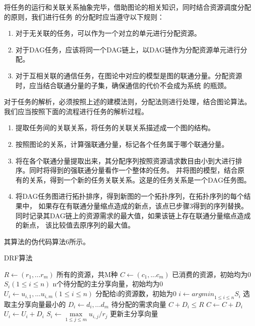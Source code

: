 将任务的运行和关联关系抽象完毕，借助图论的相关知识，同时结合资源调度分配的原则，我们进行任务
的分配时应当遵守以下规则：
\begin{enumerate}
\item 对于无关联的任务，可以作为一个对立的单元进行分配资源。
\item 对于DAG任务，应该将同一个DAG链上，以DAG链作为分配资源单元进行分配。
\item 对于互相关联的通信任务，在图论中对应的模型是图的联通分量。分配资源时，应当结合联通分量的子集，确保通信的代价不会成为系统
的瓶颈。
\end{enumerate}

对于任务的解析，必须按照上述的建模法则，分配法则进行处理，结合图论算法。我们应当按照下面的流程进行任务的解析过程。
\begin{enumerate}
\item 提取任务间的关联关系，将任务的关联关系描述成一个图的结构。
\item 按照图论的关系，计算强联通分量，标记各个任务属于哪个联通分量。
\item 将在各个联通分量提取出来，其分配序列按照资源请求数目由小到大进行排序。同时将得到的强联通分量看作一个整体的任务。
并将图的模型，结合原有的关系，得到一个新的任务关联关系。这是的任务关系是一个DAG任务图。
\item 将DAG任务图进行拓扑排序，得到新图的一个拓扑序列，在拓扑序列的每个结果中，
如果存在有联通分量缩点造成的新点，该点已步骤3得到的序列替换。
同时记录其DAG链上的资源需求的最大值，如果该链上存在联通分量缩点造成的新点，
该比较值去原序列的最大值。
\end{enumerate}
其算法的伪代码算法6所示。
\begin{algorithm} 
\caption {DRF算法} 
\begin{codebox}
\li	$R \leftarrow \left({r}_{1},...{r}_{m} \right)$ \RComment 所有的资源，共M种
\li	$C \leftarrow \left({c}_{1},...{c}_{m}\right)$ \RComment 已消费的资源，初始均为0
\li	${S}_{i} (1 \leq i \leq n)$				\RComment n个待分配的主分享向量，初始均为0
\li	${U}_{i} \leftarrow {{u}_{i,1},...{u}_{i,m}}(1 \leq i \leq n)$	\RComment 分配给i的资源数，初始为0
\li	$i \leftarrow {argmin}_{1 \leq i \leq n} {{S}_{i}}$ \RComment 选取主分享向量最小的
\li	${D}_{i} \leftarrow {{d}_{i},...{d}_{m}}$ \RComment 待分配的需求向量
\li	\If $C + {D}_{i} \leq R$
\li	\Then 
		$C \leftarrow C + D_{i}$                  
\li            	${U}_{i} \leftarrow {U}_{i} + {D}_{i}$ 
\li		${S}_{i} \leftarrow \max \limits_{1 \leq j \leq m} {{{u}_{i,j}}/{r}_{j}}$ \RComment 更新主分享向量
\li	\Else
\li		\Return
	\End
\end{codebox}
\end{algorithm} 
